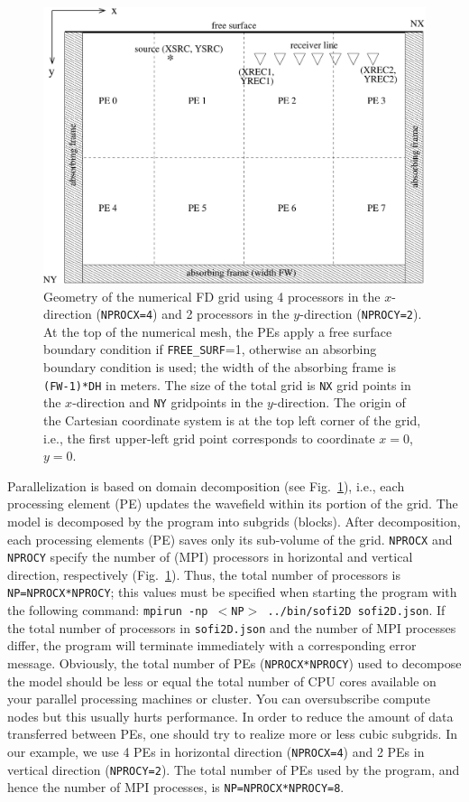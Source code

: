 \begin{figure}[ht!]
\centering
    \includegraphics[width=12cm,angle=0]{figures/grid.pdf}
    \caption{Geometry of the numerical FD grid using 4 processors in the $x$-direction (\texttt{NPROCX=4}) and 2 processors in the $y$-direction (\texttt{NPROCY=2}). At the top of the numerical mesh, the PEs apply a free surface boundary condition if \texttt{FREE\_SURF}=1, otherwise an absorbing boundary condition is used; the width of the absorbing frame is \texttt{(FW-1)*DH} in meters. The size of the total grid is \texttt{NX} grid points in the $x$-direction and \texttt{NY} gridpoints in the $y$-direction. The origin of the Cartesian coordinate system is at the top left corner of the grid, i.e., the first upper-left grid point corresponds to coordinate $x=0$, $y=0$.}
\label{fig_grid}
\end{figure}

Parallelization is based on domain decomposition (see Fig.~\ref{fig_grid}), i.e., each processing element (PE) updates the wavefield within its portion of the grid. The model is decomposed by the program into subgrids (blocks). After decomposition, each processing elements (PE) saves only its sub-volume of the grid. \texttt{NPROCX} and \texttt{NPROCY} specify the number of (MPI) processors in horizontal and vertical direction, respectively (Fig.~\ref{fig_grid}). Thus, the total number of processors is \texttt{NP=NPROCX*NPROCY}; this values must be specified when starting the program with the following command: \texttt{mpirun -np $<$NP$>$ ../bin/sofi2D sofi2D.json}. If the total number of processors in \texttt{sofi2D.json} and the number of MPI processes differ, the program will terminate immediately with a corresponding error message. Obviously, the total number of PEs (\texttt{NPROCX*NPROCY}) used to decompose the model should be less or equal the total number of CPU cores available on your parallel processing machines or cluster. You can oversubscribe compute nodes but this usually hurts performance. In order to reduce the amount of data transferred between PEs, one should try to realize more or less cubic subgrids. In our example, we use 4 PEs in horizontal direction (\texttt{NPROCX=4}) and 2 PEs in vertical direction (\texttt{NPROCY=2}). The total number of PEs used by the program, and hence the number of MPI processes, is \texttt{NP=NPROCX*NPROCY=8}.

